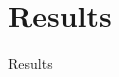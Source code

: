 \documentclass[usenames,dvipsnames,t]{beamer}
\begin{document}
%
%
%
%
%
%
%
%




\section{Results}


\begin{frame}[plain]
\vspace{3cm}
\centering
\LARGE 
Results
\end{frame}

%
%
\end{document}
